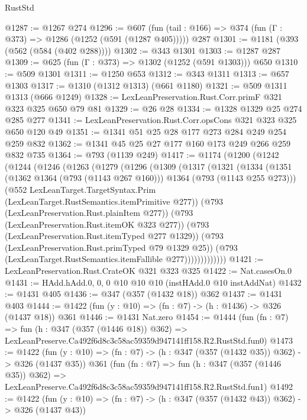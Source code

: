 \begin{lexlean}{RustStd}
\begin{coremodule}
@1287 := @1267 @274
@1296 := @607 (fun (tail : @166) => @374 (fun (Γ : @373) => @1286 (@1252 (@591 (@1287 @405))))) @287
@1301 := @1181 (@393 (@562 (@584 (@402 @288))))
@1302 := @343 @1301
@1303 := @1287 @287
@1309 := @625 (fun (Γ : @373) => @1302 (@1252 (@591 @1303))) @650
@1310 := @509 @1301
@1311 := @1250 @653
@1312 := @343 @1311
@1313 := @657 @1303
@1317 := @1310 (@1312 @1313) (@661 @1180)
@1321 := @509 @1311 @1313 (@666 @1249)
@1328 := LexLeanPreservation.Rust.Corr.primF @321 @323 @325 @650 @79 @81
@1329 := @26 @28
@1334 := @1328 @1329 @25 @274 @285 @277
@1341 := LexLeanPreservation.Rust.Corr.opsCons @321 @323 @325 @650 @120 @49
@1351 := @1341 @51 @25 @28 @177 @273 @284 @249 @254 @259 @832
@1362 := @1341 @45 @25 @27 @177 @160 @173 @249 @266 @259 @832 @735
@1364 := @793 (@1139 @249)
@1417 := @1174
    (@1200
      (@1242
        (@1244
          (@1246
            (@1263
              (@1279
                (@1296
                  (@1309
                    (@1317
                      (@1321
                        (@1334
                          (@1351
                            (@1362 @1364 (@793 (@1143 @267 @160)))
                            @1364
                            (@793 (@1143 @255 @273)))
                          (@552
                            LexLeanTarget.TargetSyntax.Prim
                            (LexLeanTarget.RustSemantics.itemPrimitive @277))
                          (@793 (LexLeanPreservation.Rust.plainItem @277))
                          (@793 (LexLeanPreservation.Rust.itemOK @323 @277))
                          (@793 (LexLeanPreservation.Rust.itemTyped @277 @1329))
                          (@793 (LexLeanPreservation.Rust.primTyped @79 @1329 @25))
                          (@793 (LexLeanTarget.RustSemantics.itemFallible @277)))))))))))))
@1421 := LexLeanPreservation.Rust.CrateOK @321 @323 @325
@1422 := Nat.casesOn.{0}
@1431 := HAdd.hAdd.{0, 0, 0} @10 @10 @10 (instHAdd.{0} @10 instAddNat)
@1432 := @1431 @405
@1436 := @347 (@357 (@1432 @18)) @362
@1437 := @1431 @403
@1444 := @1422 (fun (y : @10) => (fn : @7) -> (h : @1436) -> @326 (@1437 @18)) @361
@1446 := @1431 Nat.zero
@1454 := @1444
    (fun (fn : @7) =>
    fun (h : @347 (@357 (@1446 @18)) @362) =>
    LexLeanPreserve.Ca492f6d8c3c58ac59359d947141ff158.R2.RustStd.fun0)
@1473 := @1422
    (fun (y : @10) => (fn : @7) -> (h : @347 (@357 (@1432 @35)) @362) -> @326 (@1437 @35))
    @361
    (fun (fn : @7) =>
    fun (h : @347 (@357 (@1446 @35)) @362) =>
    LexLeanPreserve.Ca492f6d8c3c58ac59359d947141ff158.R2.RustStd.fun1)
@1492 := @1422
    (fun (y : @10) => (fn : @7) -> (h : @347 (@357 (@1432 @43)) @362) -> @326 (@1437 @43))

\end{coremodule}
\end{lexlean}
